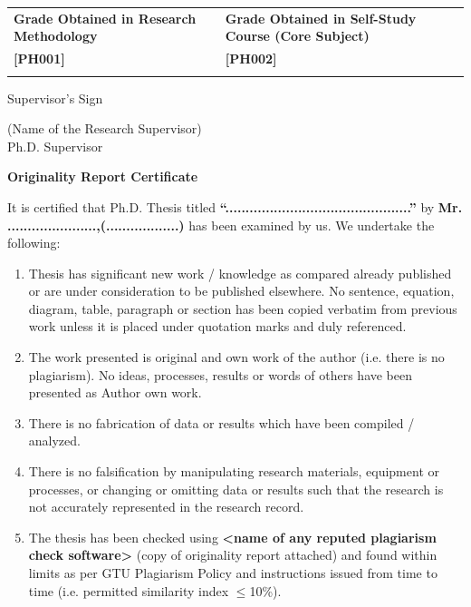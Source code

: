 \vspace{1cm}

\begin{center}
	\begin{tabular}{|>{\centering\arraybackslash}p{7cm}|>{\centering\arraybackslash}p{7cm}|}
		\hline
		\textbf{Grade Obtained in Research Methodology} &
		\textbf{Grade Obtained in Self-Study Course (Core Subject)} \\
		\textbf{[PH001]} & \textbf{[PH002]} \\
		\hline
		 &  \\
		\hline
	\end{tabular}
\end{center}



\vspace{1cm}

Supervisor’s Sign

\vspace{2cm}

(Name of the Research Supervisor)\\
Ph.D. Supervisor


\newpage

\begin{center}
	\Large	\textbf{Originality Report Certificate}
\end{center}

It is certified that Ph.D. Thesis titled \textbf{“..............................................”} by  \textbf{Mr. ......................,(..................)}  has been examined by us. We undertake the following:

\begin{enumerate} [label=\alph*.]
	\item Thesis has significant new work / knowledge as compared already published or are under consideration to be published elsewhere. No sentence, equation, diagram, table, paragraph or section has been copied verbatim from previous work unless it is placed under quotation marks and duly referenced. 
	\item The work presented is original and own work of the author (i.e. there is no plagiarism). No ideas, processes, results or words of others have been presented as Author own work. 
	\item There is no fabrication of data or results which have been compiled / analyzed. 
	\item There is no falsification by manipulating research materials, equipment or processes, or changing or omitting data or results such that the research is not accurately represented in the research record. 
	\item The thesis has been checked using \textbf{<name of any reputed plagiarism check software>} (copy of originality report attached) and found within limits as per GTU Plagiarism Policy and instructions issued from time to time (i.e. permitted similarity index $\leqslant$10\%). 
\end{enumerate}

